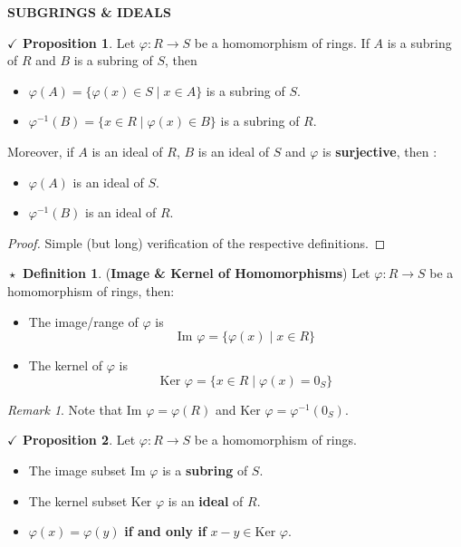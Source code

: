 \documentclass{article}
\theoremstyle{definition}
\newtheorem{definition}{$\boxed{\star}$ Definition}
\theoremstyle{remark}
\newtheorem*{remark}{Remark}
\theoremstyle{definition}
\theoremstyle{definition}
\newtheorem{proposition}{$\checkmark$ Proposition}
\theoremstyle{definition}
\theoremstyle{proof}
\newcommand{\inv}[1]{#1^{-1}}
\newcommand{\image}[0]{\text{Im }}
\newcommand{\kernel}[0]{\text{Ker }}
\begin{document}
\hrulefill
\textbf{SUBGRINGS \& IDEALS}
\hrulefill
\begin{proposition}
	Let $ \varphi : R \to S $ be a homomorphism of rings. If $ A $ is a subring of $ R $ and $ B $ is a subring of $ S $, then
	\begin{itemize}
		\item{$ \varphi(A) = \{\varphi(x) \in S\;\vert\; x\in A\}$ is a subring of $ S $.}
		\item{$ \inv{\varphi}(B) = \{x\in R \;\vert\;\varphi(x) \in B\} $ is a subring of $ R $.}
	\end{itemize}
Moreover, if $ A $ is an ideal of $ R $, $ B $ is an ideal of $ S $ and $ \varphi $ is \textbf{surjective}, then :
\begin{itemize}
	\item{$ \varphi(A) $ is an ideal of $ S $.}
	\item{$ \inv{\varphi}(B) $ is an ideal of $ R $.}
\end{itemize}
\end{proposition}
\begin{proof}
	Simple (but long) verification of the respective definitions.
\end{proof}
\hrulefill
\begin{definition}
	(\textbf{Image \& Kernel of Homomorphisms}) Let $ \varphi: R\to S $ be a homomorphism of rings, then:
	\begin{itemize}
		\item{The image/range of $ \varphi $ is 
	\[\image \varphi = \{\varphi(x)\;\vert\;x\in R\}\]	
	}
\item{The kernel of $ \varphi $ is
\[\kernel\varphi = \{x\in R\;\vert\; \varphi(x) = 0_S\}\]
}
	\end{itemize}
\end{definition}
\begin{remark}
	Note that $ \image\varphi = \varphi(R) $ and $ \kernel\varphi = \inv{\varphi}(0_S) $.
\end{remark}
\hrulefill
\begin{proposition}
	Let $ \varphi : R\to S $ be a homomorphism of rings. 
	\begin{itemize}
		\item{The image subset $ \image\varphi $ is a \textbf{subring} of $ S $.}
		\item{The kernel subset $ \kernel \varphi $ is an \textbf{ideal} of $ R $.}
		\item{$ \varphi(x) = \varphi(y) $ \textbf{if and only if} $ x-y\in \kernel\varphi $.}
	\end{itemize}
\end{proposition}
\end{document}
